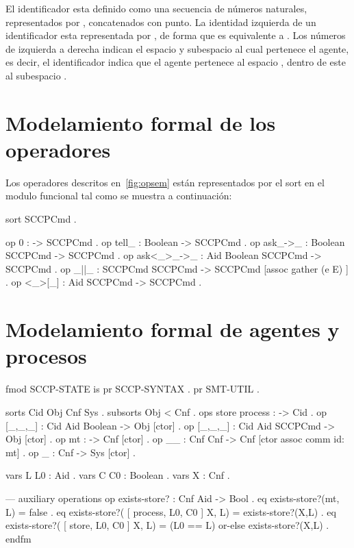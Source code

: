 El identificador esta definido como una secuencia de n\'umeros naturales, representados por , concatenados con punto. La identidad izquierda de un identificador esta representada por , de forma que  es equivalente a . Los n\'umeros de izquierda a derecha indican el espacio y subespacio al cual pertenece el agente, es decir, el identificador  indica que el agente pertenece al espacio , dentro de este al subespacio . 

\section{Modelamiento formal de los operadores}
\label{syntax.rew}

Los operadores descritos en~\ref{fig:opsem} est\'an representados por el sort  en el modulo funcional  tal como se muestra a continuaci\'on:

\begin{maude}
  sort SCCPCmd .

  op 0 : -> SCCPCmd . 
  op tell_ : Boolean -> SCCPCmd . 
  op ask_->_ : Boolean SCCPCmd -> SCCPCmd .
  op ask<_>_->_ : Aid Boolean SCCPCmd -> SCCPCmd .
  op _||_ : SCCPCmd SCCPCmd -> SCCPCmd [assoc gather (e E) ] .
  op <_>[_] : Aid SCCPCmd -> SCCPCmd .
\end{maude}



\section{Modelamiento formal de agentes y procesos}
\label{state.rew}

\begin{maude}
fmod SCCP-STATE is
  pr SCCP-SYNTAX .
  pr SMT-UTIL .

  sorts Cid Obj Cnf Sys .
  subsorts Obj < Cnf .
  ops store process : -> Cid .
  op [_,_,_] : Cid Aid Boolean -> Obj [ctor] .
  op [_,_,_] : Cid Aid SCCPCmd -> Obj [ctor] .
  op mt : -> Cnf [ctor] .
  op __ : Cnf Cnf -> Cnf [ctor assoc comm id: mt] .
  op {_} : Cnf -> Sys [ctor] .

  vars L L0    : Aid .
  vars C C0    : Boolean .
  vars X       : Cnf .

  --- auxiliary operations
  op exists-store? : Cnf Aid -> Bool .
  eq exists-store?(mt, L)
   = false .
  eq exists-store?( [ process, L0, C0 ] X, L)
   = exists-store?(X,L) .
  eq exists-store?( [ store, L0, C0 ] X, L)
   = (L0 == L) or-else exists-store?(X,L) .
endfm
\end{maude}

